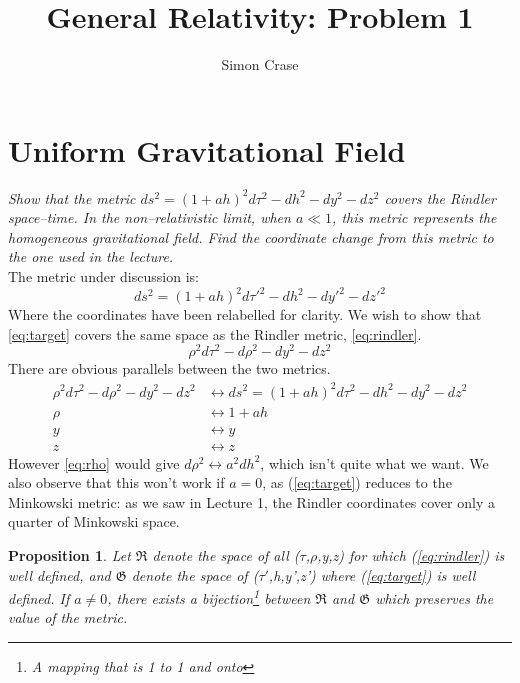 \documentclass[11pt,a4paper]{article}
\author{Simon Crase}
\title{General Relativity: Problem 1}
\begin{document}
\maketitle

\section{Uniform Gravitational Field}

\textit{Show that the metric $ds^{2}=(1+ah)^{2}d\tau^{2}-dh^{2}-dy^{2}-dz^{2}$ covers the Rindler space--time. In the non--relativistic limit, when $a\ll1$, this metric represents the homogeneous gravitational field. Find the coordinate change from this metric to the one used in the lecture.} \\[12pt]
The metric under discussion is:
\begin{equation} \label{eq:target}
 ds^{2}=(1+ah)^{2}d\tau'^{2}-dh^{2}-dy'^{2}-dz'^{2} 
\end{equation}
Where the coordinates have been relabelled for clarity. We wish to show that \eqref{eq:target} covers the same space as the Rindler metric, \eqref{eq:rindler}.
\begin{equation} \label{eq:rindler}
\rho^{2}d\tau^{2}-d\rho^{2}-dy^{2}-dz^{2}
\end{equation}
There are obvious parallels between the two metrics.
\begin{align}
\rho^{2}d\tau^{2}-d\rho^{2}-dy^{2}-dz^{2} & \leftrightarrow ds^{2}=(1+ah)^{2}d\tau^{2}-dh^{2}-dy^{2}-dz^{2} \\
\rho & \leftrightarrow 1+ah \label{eq:rho} \\
y & \leftrightarrow y \\
z & \leftrightarrow z
\end{align}
However \eqref{eq:rho} would  give $ d\rho^{2} \leftrightarrow a^{2}dh^{2}$, which isn't quite what we want. We also observe that this won't work if $a=0$, as (\ref{eq:target}) reduces to the Minkowski metric: as we saw in Lecture 1, the Rindler coordinates cover only a quarter of Minkowski space.

\newtheorem{thm:isomorphism}{Proposition}
\begin{thm:isomorphism}
	Let $\mathfrak{R}$ denote the space of all ($\tau$,$\rho$,y,z) for which (\ref{eq:rindler}) is well defined, and $\mathfrak{G}$ denote the space of ($\tau'$,h,y',z') where (\ref{eq:target}) is well defined. If $a\neq0$, there exists a bijection\footnote{A mapping that is 1 to 1 and onto} between $\mathfrak{R}$ and $\mathfrak{G}$ which preserves the value of the metric. 
\end{thm:isomorphism}
\end{document}
